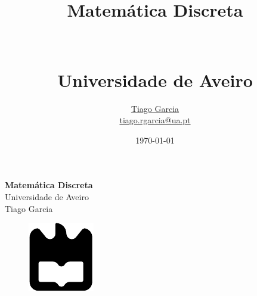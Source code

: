 \documentclass[11pt]{report}
\begin{document}
\def\titulo{Matemática Discreta}
\def\autores{Tiago Garcia}
\def\autorescontactos{tiago.rgarcia@ua.pt}
\def\empresa{Universidade de Aveiro}
\def\logotipo{ua.pdf}

%
\def\tema{}
%

\begin{titlepage}
\begin{center}
\vspace*{50mm}
{\Huge\textbf{\titulo}}\\
\vspace{10mm}
{\Large \empresa}\\
\vspace{10mm}
{\LARGE \autores}\\
\vspace{30mm}
\begin{figure}[h]
    \center
    \includegraphics{ua}\label{fig:ua-title}
\end{figure}
\vspace{30mm}
\end{center}
\end{titlepage}
\title{
{\LARGE\textbf{\titulo} }\\\\
{\Large \aula\\ \empresa}
}
\author{
    \href{https://github.com/TiagoRG}{\autores} \\
    \href{mailto:tiago.rgarcia@ua.pt}{\autorescontactos}
}
\date{\today}
\maketitle
{}
\clearpage

\end{document}
